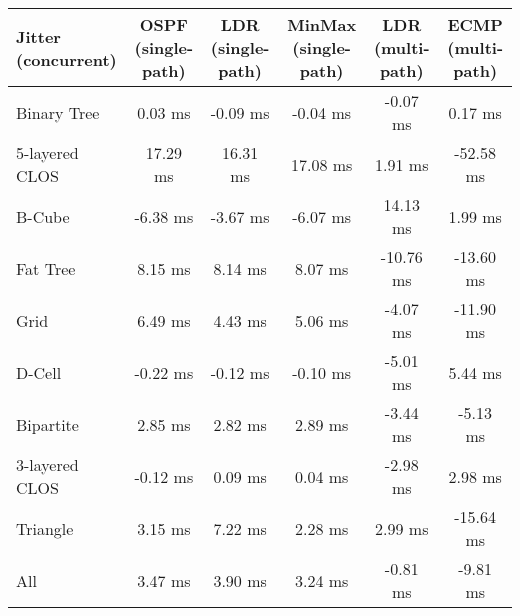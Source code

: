 \begin{tabular}{l|ccccc}
Jitter (concurrent) & OSPF (single-path) & LDR (single-path) & MinMax (single-path) & LDR (multi-path) & ECMP (multi-path) \\
\hline
Binary Tree         & 0.03 ms            & -0.09 ms          & -0.04 ms             & -0.07 ms         & 0.17 ms           \\
5-layered CLOS      & 17.29 ms           & 16.31 ms          & 17.08 ms             & 1.91 ms          & -52.58 ms         \\
B-Cube              & -6.38 ms           & -3.67 ms          & -6.07 ms             & 14.13 ms         & 1.99 ms           \\
Fat Tree            & 8.15 ms            & 8.14 ms           & 8.07 ms              & -10.76 ms        & -13.60 ms         \\
Grid                & 6.49 ms            & 4.43 ms           & 5.06 ms              & -4.07 ms         & -11.90 ms         \\
D-Cell              & -0.22 ms           & -0.12 ms          & -0.10 ms             & -5.01 ms         & 5.44 ms           \\
Bipartite           & 2.85 ms            & 2.82 ms           & 2.89 ms              & -3.44 ms         & -5.13 ms          \\
3-layered CLOS      & -0.12 ms           & 0.09 ms           & 0.04 ms              & -2.98 ms         & 2.98 ms           \\
Triangle            & 3.15 ms            & 7.22 ms           & 2.28 ms              & 2.99 ms          & -15.64 ms         \\
All                 & 3.47 ms            & 3.90 ms           & 3.24 ms              & -0.81 ms         & -9.81 ms          \\
\end{tabular}